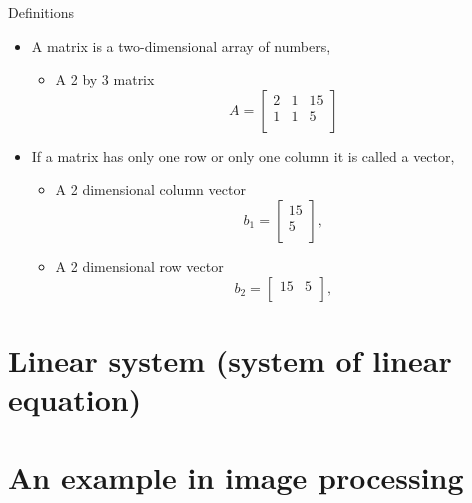 \documentclass{beamer}
\theoremstyle{definition}
\theoremstyle{theorem}
\begin{document}
\begin{frame}
{Definitions}
\begin{itemize}
 \item A matrix is a two-dimensional array of numbers, 
\begin{itemize}
 \item A 2 by 3 matrix 
 $$ A = 
\begin{bmatrix}
 2 & 1 & 15\\
 1 & 1 & 5\\
 \end{bmatrix}
$$
\end{itemize}
\item If a matrix has only one row or only one column it is called a vector, 
\begin{itemize}
 \item A 2 dimensional column vector 
 $$ b_{1} = 
\begin{bmatrix}
 15 \\
 5  \\
 \end{bmatrix}, 
 $$
\item A 2 dimensional  row vector
 $$  b_{2} = 
 \begin{bmatrix}
 15 &
 5  \\
 \end{bmatrix}, 
 $$
\end{itemize} 
\end{itemize}
\end{frame}

\section{Linear system (system of linear equation)}

\section{An  example in image processing}
\end{document}
